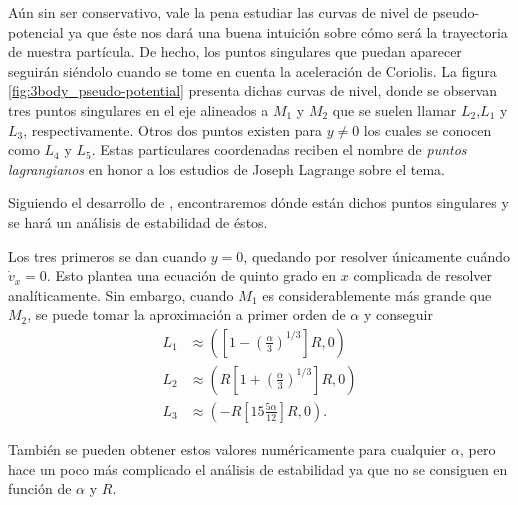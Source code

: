 Aún sin ser conservativo, vale la pena estudiar las curvas de nivel de pseudo-potencial ya que éste nos dará una buena intuición sobre cómo será la trayectoria de nuestra partícula. De hecho, los puntos singulares que puedan aparecer seguirán siéndolo cuando se tome en cuenta la aceleración de Coriolis. La figura \ref{fig:3body_pseudo-potential} presenta dichas curvas de nivel, donde se observan tres puntos singulares en el eje alineados a $M_1$ y $M_2$ que se suelen llamar $L_2$,$L_1$ y $L_3$, respectivamente. Otros dos puntos existen para $y \neq 0$ los cuales se conocen como $L_4$ y $L_5$. Estas particulares coordenadas reciben el nombre de \textit{puntos lagrangianos} en honor a los estudios de Joseph Lagrange sobre el tema.


Siguiendo el desarrollo de \cite{}, encontraremos dónde están dichos puntos singulares y se hará un análisis de estabilidad de éstos.

Los tres primeros se dan cuando $y=0$, quedando por resolver únicamente cuándo $\dot{v}_x = 0$. Esto plantea una ecuación de quinto grado en $x$ complicada de resolver analíticamente. Sin embargo, cuando $M_1$ es considerablemente más grande que $M_2$, se puede tomar la aproximación a primer orden de $\alpha$ y conseguir
\begin{align*}
 L_1 &\approx \left( \left[ 1 - \left(\frac{\alpha}{3}\right)^{1/3} \right] R , 0 \right) \\ 
 L_2 &\approx \left( R\left[ 1 + \left(\frac{\alpha}{3}\right)^{1/3} \right] R , 0 \right) \\
 L_3 &\approx \left( -R\left[ 1 5 \frac{5 \alpha}{12} \right] R, 0 \right).
\end{align*} 

También se pueden obtener estos valores numéricamente para cualquier $\alpha$, pero hace un poco más complicado el análisis de estabilidad ya que no se consiguen en función de $\alpha$ y $R$.


